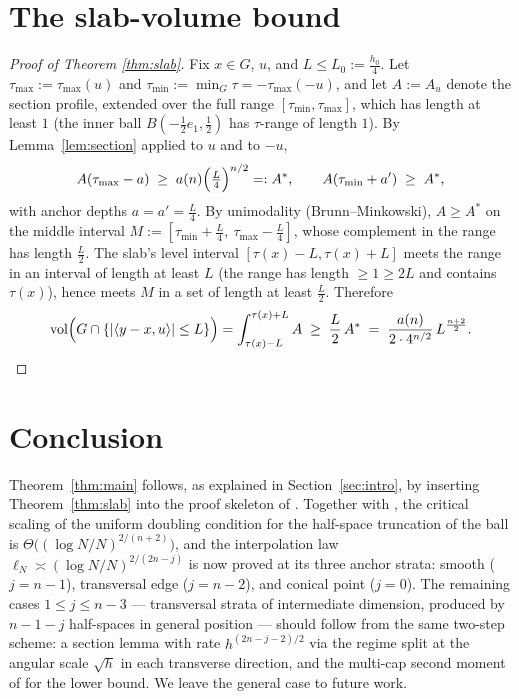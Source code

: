 \documentclass[11pt]{article}
\newcommand{\vol}{\operatorname{vol}}
\begin{document}
\section{The slab-volume bound}\label{sec:slab}

\begin{proof}[Proof of Theorem \ref{thm:slab}]
Fix $x\in G$, $u$, and $L\le L_0:=\tfrac{h_0}4$.  Let
$\tau_{\max}:=\tau_{\max}(u)$ and $\tau_{\min}:=\min_G\tau=-\tau_{\max}(-u)$,
and let $A:=A_u$ denote the section profile, extended over the full range
$[\tau_{\min},\tau_{\max}]$, which has length at least $1$ (the inner ball
$B(-\tfrac12e_1,\tfrac12)$ has $\tau$-range of length $1$).  By
Lemma~\ref{lem:section} applied to $u$ and to $-u$,
\[
A(\tau_{\max}-a)\;\ge\;a(n)\Bigl(\tfrac L4\Bigr)^{n/2}=:A^*,
\qquad
A(\tau_{\min}+a')\;\ge\;A^*,
\]
with anchor depths $a=a'=\tfrac L4$.  By unimodality (Brunn--Minkowski),
$A\ge A^*$ on the middle interval
$M:=[\tau_{\min}+\tfrac L4,\ \tau_{\max}-\tfrac L4]$, whose complement in the
range has length $\tfrac L2$.  The slab's level interval
$[\tau(x)-L,\tau(x)+L]$ meets the range in an interval of length at least
$L$ (the range has length $\ge1\ge2L$ and contains $\tau(x)$), hence meets
$M$ in a set of length at least $\tfrac L2$.  Therefore
\[
\vol\Bigl(G\cap\{|\langle y-x,u\rangle|\le L\}\Bigr)
=\int_{\tau(x)-L}^{\tau(x)+L}A
\;\ge\;\frac L2\,A^*
\;=\;\frac{a(n)}{2\cdot4^{n/2}}\,L^{\frac{n+2}2}.
\]
\end{proof}

\section{Conclusion}\label{sec:concl}

Theorem~\ref{thm:main} follows, as explained in Section~\ref{sec:intro}, by
inserting Theorem~\ref{thm:slab} into the proof skeleton of
\cite{companion2,companion3}.  Together with
\cite{companion6}, the critical scaling of the uniform doubling condition for
the half-space truncation of the ball is
$\Theta\bigl((\log N/N)^{2/(n+2)}\bigr)$, and the interpolation law
$\ell_N\asymp(\log N/N)^{2/(2n-j)}$ is now proved at its three anchor strata:
smooth ($j=n-1$), transversal edge ($j=n-2$), and conical point ($j=0$).  The
remaining cases $1\le j\le n-3$ --- transversal strata of intermediate
dimension, produced by $n-1-j$ half-spaces in general position --- should
follow from the same two-step scheme: a section lemma with rate
$h^{(2n-j-2)/2}$ via the regime split at the angular scale
$\sqrt h$ in each transverse direction, and the multi-cap second moment of
\cite{companion4,companion5,companion6} for the lower bound.  We leave the
general case to future work.
\end{document}

